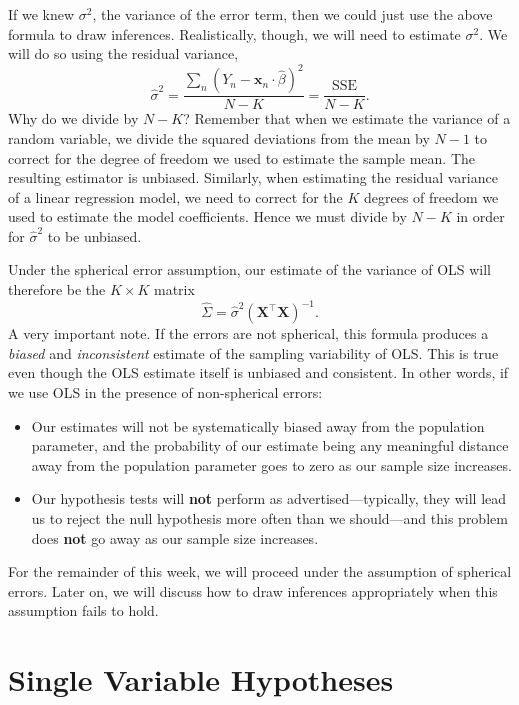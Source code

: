 \documentclass[
  12pt,
  oneside,openany]{book}
\begin{document}
If we knew \(\sigma^2\), the variance of the error term, then we could just use the above formula to draw inferences. Realistically, though, we will need to estimate \(\sigma^2\). We will do so using the residual variance,
\[
\hat{\sigma}^2
= \frac{\sum_n (Y_n - \mathbf{x}_n \cdot \hat{\beta})^2}{N - K}
= \frac{\text{SSE}}{N - K}.
\]
Why do we divide by \(N - K\)? Remember that when we estimate the variance of a random variable, we divide the squared deviations from the mean by \(N - 1\) to correct for the degree of freedom we used to estimate the sample mean. The resulting estimator is unbiased. Similarly, when estimating the residual variance of a linear regression model, we need to correct for the \(K\) degrees of freedom we used to estimate the model coefficients. Hence we must divide by \(N - K\) in order for \(\hat{\sigma}^2\) to be unbiased.

Under the spherical error assumption, our estimate of the variance of OLS will therefore be the \(K \times K\) matrix
\[
\hat{\Sigma} = \hat{\sigma}^2 (\mathbf{X}^\top \mathbf{X})^{-1}.
\]
A very important note. If the errors are not spherical, this formula produces a \emph{biased} and \emph{inconsistent} estimate of the sampling variability of OLS. This is true even though the OLS estimate itself is unbiased and consistent. In other words, if we use OLS in the presence of non-spherical errors:

\begin{itemize}
\item
  Our estimates will not be systematically biased away from the population parameter, and the probability of our estimate being any meaningful distance away from the population parameter goes to zero as our sample size increases.
\item
  Our hypothesis tests will \textbf{not} perform as advertised---typically, they will lead us to reject the null hypothesis more often than we should---and this problem does \textbf{not} go away as our sample size increases.
\end{itemize}

For the remainder of this week, we will proceed under the assumption of spherical errors. Later on, we will discuss how to draw inferences appropriately when this assumption fails to hold.

\hypertarget{single-variable-hypotheses}{%
\section{Single Variable Hypotheses}\label{single-variable-hypotheses}}
\end{document}
